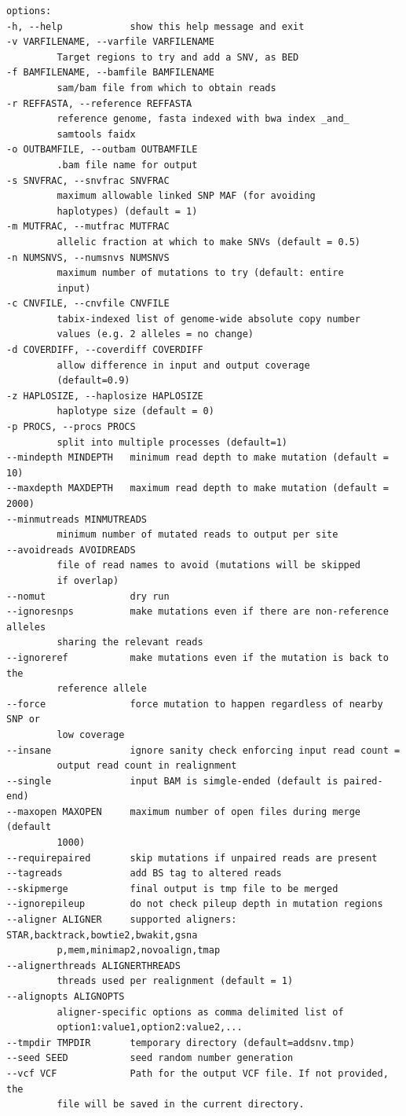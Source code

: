 \documentclass[letterpaper,11pt]{article}
\begin{document}
\begin{verbatim}
options:
-h, --help            show this help message and exit
-v VARFILENAME, --varfile VARFILENAME
         Target regions to try and add a SNV, as BED
-f BAMFILENAME, --bamfile BAMFILENAME
         sam/bam file from which to obtain reads
-r REFFASTA, --reference REFFASTA
         reference genome, fasta indexed with bwa index _and_
         samtools faidx
-o OUTBAMFILE, --outbam OUTBAMFILE
         .bam file name for output
-s SNVFRAC, --snvfrac SNVFRAC
         maximum allowable linked SNP MAF (for avoiding
         haplotypes) (default = 1)
-m MUTFRAC, --mutfrac MUTFRAC
         allelic fraction at which to make SNVs (default = 0.5)
-n NUMSNVS, --numsnvs NUMSNVS
         maximum number of mutations to try (default: entire
         input)
-c CNVFILE, --cnvfile CNVFILE
         tabix-indexed list of genome-wide absolute copy number
         values (e.g. 2 alleles = no change)
-d COVERDIFF, --coverdiff COVERDIFF
         allow difference in input and output coverage
         (default=0.9)
-z HAPLOSIZE, --haplosize HAPLOSIZE
         haplotype size (default = 0)
-p PROCS, --procs PROCS
         split into multiple processes (default=1)
--mindepth MINDEPTH   minimum read depth to make mutation (default = 10)
--maxdepth MAXDEPTH   maximum read depth to make mutation (default = 2000)
--minmutreads MINMUTREADS
         minimum number of mutated reads to output per site
--avoidreads AVOIDREADS
         file of read names to avoid (mutations will be skipped
         if overlap)
--nomut               dry run
--ignoresnps          make mutations even if there are non-reference alleles
         sharing the relevant reads
--ignoreref           make mutations even if the mutation is back to the
         reference allele
--force               force mutation to happen regardless of nearby SNP or
         low coverage
--insane              ignore sanity check enforcing input read count =
         output read count in realignment
--single              input BAM is simgle-ended (default is paired-end)
--maxopen MAXOPEN     maximum number of open files during merge (default
         1000)
--requirepaired       skip mutations if unpaired reads are present
--tagreads            add BS tag to altered reads
--skipmerge           final output is tmp file to be merged
--ignorepileup        do not check pileup depth in mutation regions
--aligner ALIGNER     supported aligners: STAR,backtrack,bowtie2,bwakit,gsna
         p,mem,minimap2,novoalign,tmap
--alignerthreads ALIGNERTHREADS
         threads used per realignment (default = 1)
--alignopts ALIGNOPTS
         aligner-specific options as comma delimited list of
         option1:value1,option2:value2,...
--tmpdir TMPDIR       temporary directory (default=addsnv.tmp)
--seed SEED           seed random number generation
--vcf VCF             Path for the output VCF file. If not provided, the
         file will be saved in the current directory.


\end{verbatim}
\end{document}
